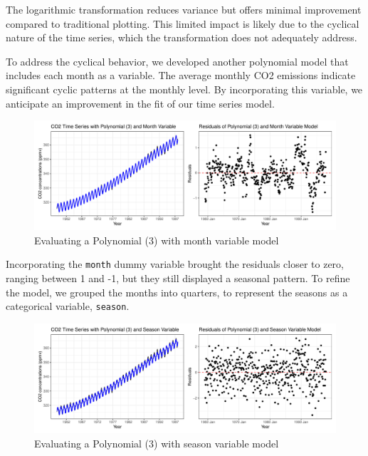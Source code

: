 \documentclass[
]{article}
\begin{document}
The logarithmic transformation reduces variance but offers minimal improvement compared to traditional plotting. This limited impact is likely due to the cyclical nature of the time series, which the transformation does not adequately address.

To address the cyclical behavior, we developed another polynomial model that includes each month as a variable. The average monthly CO2 emissions indicate significant cyclic patterns at the monthly level. By incorporating this variable, we anticipate an improvement in the fit of our time series model.

\begin{figure}

{\centering \includegraphics[width=1\linewidth]{lab_prompt_Updated_files/figure-latex/plot-month-1} 

}

\caption{Evaluating a Polynomial (3) with month variable model}\label{fig:plot-month}
\end{figure}

Incorporating the \texttt{month} dummy variable brought the residuals closer to zero, ranging between 1 and -1, but they still displayed a seasonal pattern. To refine the model, we grouped the months into quarters, to represent the seasons as a categorical variable, \texttt{season}.

\begin{figure}

{\centering \includegraphics[width=1\linewidth]{lab_prompt_Updated_files/figure-latex/plot-seasonal-1} 

}

\caption{Evaluating a Polynomial (3) with season variable model}\label{fig:plot-seasonal}
\end{figure}
\end{document}
